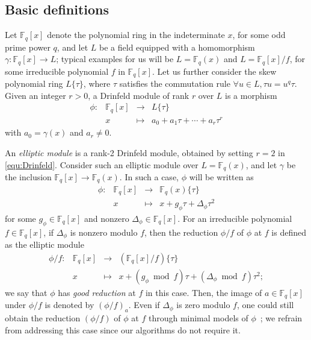 \documentclass[12pt]{article}
\theoremstyle{plain}
\theoremstyle{definition}
\newcommand{\ang}[1]{\{#1\}}
\def\F{\ensuremath{\mathbb{F}}}
\begin{document}
\subsection{Basic definitions}

Let $\F_q[x]$ denote the polynomial ring in the indeterminate $x$, for
some odd prime power $q$, and let $L$ be a field equipped with a
homomorphism $\gamma:\F_q[x] \to L$; typical examples for us will be
$L=\F_q(x)$ and $L=\F_q[x]/f$, for some irreducible polynomial $f$ in
$\F_q[x]$.  Let us further consider the skew polynomial ring
$L\{\tau\}$, where $\tau$ satisfies the commutation rule $\forall u
\in L, \tau u = u^q \tau$. Given an integer $r > 0$, a Drinfeld module of rank $r$
over $L$ is a morphism
\begin{equation}
\label{equ:Drinfeld}
	\begin{array}{rrll}
		\phi : & \F_q[x] & \longrightarrow & L\{\tau\} \\
		& x & \longmapsto & a_0 + a_1\tau + \cdots + a_r\tau^r	
	\end{array}
\end{equation}
with $a_0 = \gamma(x)$ and $a_r \ne 0$. 


An \textit{elliptic module} is a rank-2 Drinfeld module, obtained by
setting $r = 2$ in \eqref{equ:Drinfeld}. Consider such an elliptic module
over $L=\F_q(x)$, and let $\gamma$ be the inclusion $\F_q[x] \to \F_q(x)$.
In such a case, $\phi$ will be written as
\[
\begin{array}{rrll}
	\phi : & \F_q[x] & \longrightarrow & \F_q(x)\ang{\tau} \\
	& x & \longmapsto & x + g_\phi \tau + \Delta_\phi \tau^2	
\end{array}
\]
for some $g_\phi \in \F_q[x]$ and nonzero $\Delta_\phi \in \F_q[x]$. 
For an irreducible polynomial $f \in \F_q[x]$, if $\Delta_\phi$ is
nonzero modulo $f$, then the reduction $\phi/f$ of $\phi$ at $f$ is defined as the elliptic module
\[
\begin{array}{rcll}
	\phi/f : & \F_q[x] & \longrightarrow & (\F_q[x]/f) \ang{\tau} \\
	& x & \longmapsto & x + (g_\phi \bmod f) \tau + (\Delta_\phi\bmod f) \tau^2;
\end{array}
\]
we say that $\phi$ has {\em good reduction} at $f$ in this case.
Then,
 the image of $a \in \F_q[x]$ under $\phi/f$ is denoted by
$(\phi/f)_a$. Even if $\Delta_{\phi}$ is zero modulo $f$, one could
still obtain the reduction $(\phi/f)$ of $\phi$ at $f$ through
minimal models of $\phi$~\cite{gek1}; we refrain from
addressing this case since our algorithms do not require it.
\end{document}
